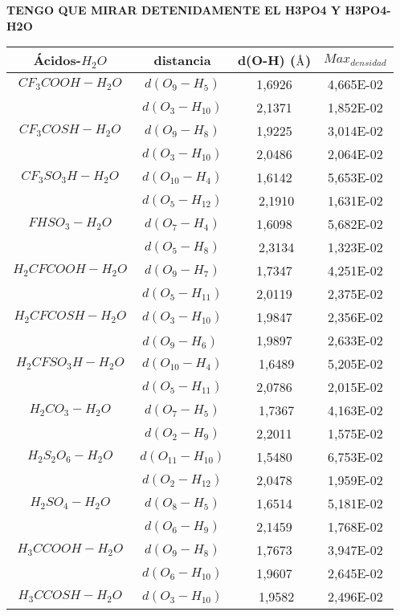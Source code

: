 {\bfseries TENGO QUE MIRAR DETENIDAMENTE EL H3PO4 Y H3PO4-H2O}

\begin{table}[H]
	\centering
	\begin{tabular}{|c|c|c|c|}
		\hline
		Ácidos-$H_2O$ & distancia	& d(O-H) ($\mbox{\normalfont\AA}$) & $Max_{densidad}$ \\ \hline
		$CF_3COOH-H_2O$ & $d(O_9-H_5)$ &1,6926&4,665E-02\\ \cline{2-4}
& $d(O_3-H_{10})$ & 2,1371 & 1,852E-02 \\ \hline
 $CF_3COSH-H_2O$ & $d(O_9-H_8)$	 & 1,9225 & 3,014E-02 \\ \cline{2-4}
	& $d(O_3-H_{10})$ & 2,0486 & 2,064E-02 \\ \hline
	$CF_3SO_3H-H_2O$ & $d(O_{10}-H_4)$ & ﻿1,6142 & 5,653E-02 \\ \cline{2-4}
	& $d(O_5-H_{12})$	&﻿ 2,1910 &	1,631E-02 \\ \hline
 $FHSO_3-H_2O$	& $d(O_7-H_4)$ & 1,6098 &	5,682E-02 \\ \cline{2-4}
	& $d(O_5-H_8)$	&﻿ 2,3134	& 1,323E-02 \\ \hline
 $H_2CFCOOH-H_2O$	&$d(O_9-H_7)$ & 1,7347	& 4,251E-02 \\ \cline{2-4}
	& $d(O_5-H_{11})$ & 2,0119	& 2,375E-02 \\ \hline
 $H_2CFCOSH-H_2O$ &	$d(O_3-H_{10})$ & 1,9847 &	2,356E-02 \\ \cline{2-4}
	& $d(O_9-H_6)$ ﻿& 1,9897	& 2,633E-02 \\ \hline
 $H_2CFSO_3H-H_2O$ &	$d(O_{10}-H_4)$	&﻿ 1,6489	& 5,205E-02 \\ \cline{2-4}
	& $d(O_5-H_{11})$ & 2,0786	& 2,015E-02 \\ \hline
 $H_2CO_3-H_2O$	& $d(O_7-H_5)$	&﻿ 1,7367	& 4,163E-02 \\ \cline{2-4}
	& $d(O_2-H_9)$ & 2,2011	& 1,575E-02 \\ \hline
 $H_2S_2O_6-H_2O$ &	$d(O_{11}-H_{10})$	& ﻿1,5480 &	6,753E-02 \\ \cline{2-4}
	& $d(O_2-H_{12})$ & 2,0478 &	1,959E-02 \\ \hline
 $H_2SO_4-H_2O$	& $d(O_8-H_5)$ & 1,6514	& 5,181E-02 \\ \cline{2-4}
	& $d(O_6-H_9)$ & 2,1459	& 1,768E-02 \\ \hline
 $H_3CCOOH-H_2O$ & $d(O_9-H_8)$ & 1,7673	& 3,947E-02 \\ \cline{2-4}
	& $d(O_6-H_{10})$ & 1,9607 &	2,645E-02 \\ \hline
 $H_3CCOSH-H_2O$ &	$d(O_3-H_{10})$	&﻿ 1,9582 &	2,496E-02 \\ \cline{2-4}

\end{tabular}
\end{table}
